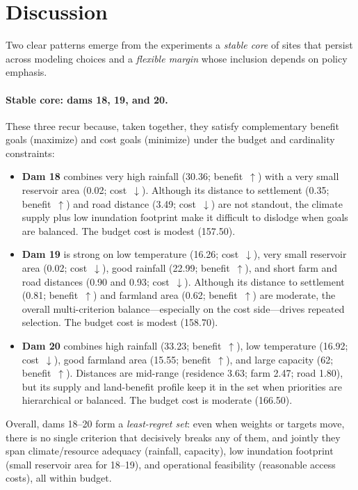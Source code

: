 \section{Discussion}\label{sec:discussion}
Two clear patterns emerge from the experiments a \textit{stable core} of sites that persist across modeling choices and a \textit{flexible margin} whose inclusion depends on policy emphasis.

\paragraph{Stable core: dams 18, 19, and 20.}
These three recur because, taken together, they satisfy complementary benefit goals (maximize) and cost goals (minimize) under the budget and cardinality constraints:
\begin{itemize}
\item \textbf{Dam 18} combines very high rainfall (30.36; benefit~$\uparrow$) with a very small reservoir area (0.02; cost~$\downarrow$). Although its distance to settlement (0.35; benefit~$\uparrow$) and road distance (3.49; cost~$\downarrow$) are not standout, the climate supply plus low inundation footprint make it difficult to dislodge when goals are balanced. The budget cost is modest (157.50).
\item \textbf{Dam 19} is strong on low temperature (16.26; cost~$\downarrow$), very small reservoir area (0.02; cost~$\downarrow$), good rainfall (22.99; benefit~$\uparrow$), and short farm and road distances (0.90 and 0.93; cost~$\downarrow$). Although its distance to settlement (0.81; benefit~$\uparrow$) and farmland area (0.62; benefit~$\uparrow$) are moderate, the overall multi-criterion balance---especially on the cost side---drives repeated selection. The budget cost is modest (158.70).
\item \textbf{Dam 20} combines high rainfall (33.23; benefit~$\uparrow$), low temperature (16.92; cost~$\downarrow$), good farmland area (15.55; benefit~$\uparrow$), and large capacity (62; benefit~$\uparrow$). Distances are mid-range (residence 3.63; farm 2.47; road 1.80), but its supply and land-benefit profile keep it in the set when priorities are hierarchical or balanced. The budget cost is moderate (166.50).
\end{itemize}
Overall, dams 18--20 form a \textit{least-regret set}: even when weights or targets move, there is no single criterion that decisively breaks any of them, and jointly they span climate/resource adequacy (rainfall, capacity), low inundation footprint (small reservoir area for 18--19), and operational feasibility (reasonable access costs), all within budget.

